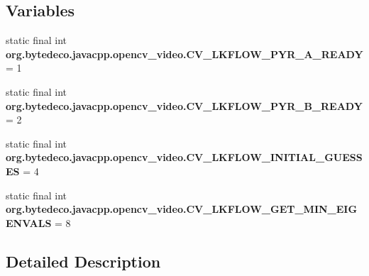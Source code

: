 \subsection*{Variables}
\begin{DoxyCompactItemize}
\item 
\mbox{\label{group__video__c_gabe8ce9c2de406b671dbe9ca2772e29a5}} 
static final int {\bfseries org.\+bytedeco.\+javacpp.\+opencv\+\_\+video.\+C\+V\+\_\+\+L\+K\+F\+L\+O\+W\+\_\+\+P\+Y\+R\+\_\+\+A\+\_\+\+R\+E\+A\+DY} = 1
\item 
\mbox{\label{group__video__c_ga1db03726be90111bb0c7cb4665ba66cc}} 
static final int {\bfseries org.\+bytedeco.\+javacpp.\+opencv\+\_\+video.\+C\+V\+\_\+\+L\+K\+F\+L\+O\+W\+\_\+\+P\+Y\+R\+\_\+\+B\+\_\+\+R\+E\+A\+DY} = 2
\item 
\mbox{\label{group__video__c_ga36eaef8fdadc50268c2f897400f44d92}} 
static final int {\bfseries org.\+bytedeco.\+javacpp.\+opencv\+\_\+video.\+C\+V\+\_\+\+L\+K\+F\+L\+O\+W\+\_\+\+I\+N\+I\+T\+I\+A\+L\+\_\+\+G\+U\+E\+S\+S\+ES} = 4
\item 
\mbox{\label{group__video__c_ga70d43824e12112123b7c7778a9ed6822}} 
static final int {\bfseries org.\+bytedeco.\+javacpp.\+opencv\+\_\+video.\+C\+V\+\_\+\+L\+K\+F\+L\+O\+W\+\_\+\+G\+E\+T\+\_\+\+M\+I\+N\+\_\+\+E\+I\+G\+E\+N\+V\+A\+LS} = 8
\end{DoxyCompactItemize}


\subsection{Detailed Description}
